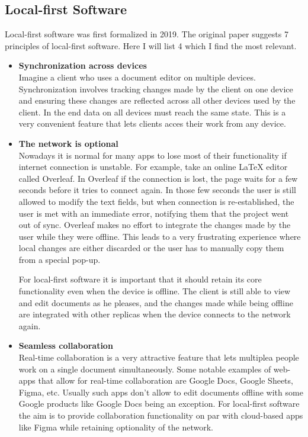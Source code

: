 \documentclass[a4paper, 11pt, oneside]{article}
\theoremstyle{definition}
\begin{document}
\subsection{Local-first Software}
Local-first software was first formalized in 2019. The original paper \cite{localfirst} suggests 7 principles of local-first software. Here I will list 4 which I find the most relevant.
\begin{itemize}
    \item \textbf{Synchronization across devices} \\
    Imagine a client who uses a document editor on multiple devices. Synchronization involves tracking changes made by the client on one device and ensuring these changes are reflected across all other devices used by the client. In the end data on all devices must reach the same state. This is a very convenient feature that lets clients acces their work from any device.

    \item \textbf{The network is optional} \\
    Nowadays it is normal for many apps to lose most of their functionality if internet connection is unstable. For example, take an online LaTeX editor called Overleaf. In Overleaf if the connection is lost, the page waits for a few seconds before it tries to connect again. In those few seconds the user is still allowed to modify the text fields, but when connection is re-established, the user is met with an immediate error, notifying them that the project went out of sync. Overleaf makes no effort to integrate the changes made by the user while they were offline. This leads to a very frustrating experience where local changes are either discarded or the user has to manually copy them from a special pop-up.
    
    For local-first software it is important that it should retain its core functionality even when the device is offline. The client is still able to view and edit documents as he pleases, and the changes made while being offline are integrated with other replicas when the device connects to the network again.

    \item \textbf{Seamless collaboration} \\
    Real-time collaboration is a very attractive feature that lets multiplea people work on a single document simultaneously. Some notable examples of web-apps that allow for real-time collaboration are Google Docs, Google Sheets, Figma, etc. Usually such apps don't allow to edit documents offline with some Google products like Google Docs being an exception. For local-first software the aim is to provide collaboration functionality on par with cloud-based apps like Figma while retaining optionality of the network.


\end{itemize}
\end{document}
